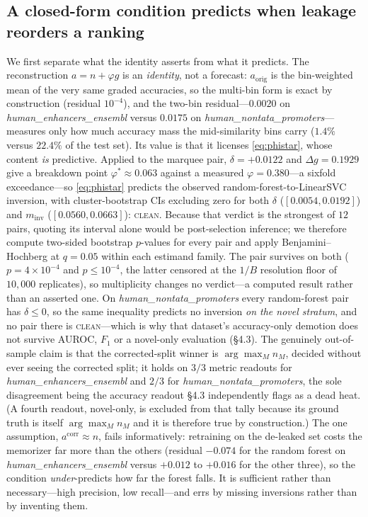 \subsection{A closed-form condition predicts when leakage reorders a ranking}\label{sec:r-law}
We first separate what the identity asserts from what it predicts. The reconstruction $a=n+\varphi g$ is an \emph{identity}, not a forecast: $a_{\mathrm{orig}}$ is the bin-weighted mean of the very same graded accuracies, so the multi-bin form is exact by construction (residual $10^{-4}$), and the two-bin residual---$0.0020$ on \textit{human\_enhancers\_ensembl} versus $0.0175$ on \textit{human\_nontata\_promoters}---measures only how much accuracy mass the mid-similarity bins carry ($1.4\%$ versus $22.4\%$ of the test set). Its value is that it licenses \eqref{eq:phistar}, whose content \emph{is} predictive. Applied to the marquee pair, $\delta=+0.0122$ and $\Delta g=0.1929$ give a breakdown point $\varphi^{*}\approx0.063$ against a measured $\varphi=0.380$---a sixfold exceedance---so \eqref{eq:phistar} predicts the observed random-forest-to-LinearSVC inversion, with cluster-bootstrap CIs excluding zero for both $\delta$ ($[0.0054,0.0192]$) and $m_{\mathrm{inv}}$ ($[0.0560,0.0663]$): \textsc{clean}. Because that verdict is the strongest of $12$ pairs, quoting its interval alone would be post-selection inference; we therefore compute two-sided bootstrap $p$-values for every pair and apply Benjamini--Hochberg at $q=0.05$ within each estimand family. The pair survives on both ($p=4\times10^{-4}$ and $p\le10^{-4}$, the latter censored at the $1/B$ resolution floor of $10{,}000$ replicates), so multiplicity changes no verdict---a computed result rather than an asserted one. On \textit{human\_nontata\_promoters} every random-forest pair has $\delta\le0$, so the same inequality predicts no inversion \emph{on the novel stratum}, and no pair there is \textsc{clean}---which is why that dataset's accuracy-only demotion does not survive AUROC, $F_1$ or a novel-only evaluation (\S4.3). The genuinely out-of-sample claim is that the corrected-split winner is $\arg\max_M n_M$, decided without ever seeing the corrected split; it holds on $3/3$ metric readouts for \textit{human\_enhancers\_ensembl} and $2/3$ for \textit{human\_nontata\_promoters}, the sole disagreement being the accuracy readout \S4.3 independently flags as a dead heat. (A fourth readout, novel-only, is excluded from that tally because its ground truth is itself $\arg\max_M n_M$ and it is therefore true by construction.) The one assumption, $a^{\mathrm{corr}}\approx n$, fails informatively: retraining on the de-leaked set costs the memorizer far more than the others (residual $-0.074$ for the random forest on \textit{human\_enhancers\_ensembl} versus $+0.012$ to $+0.016$ for the other three), so the condition \emph{under}-predicts how far the forest falls. It is sufficient rather than necessary---high precision, low recall---and errs by missing inversions rather than by inventing them.

